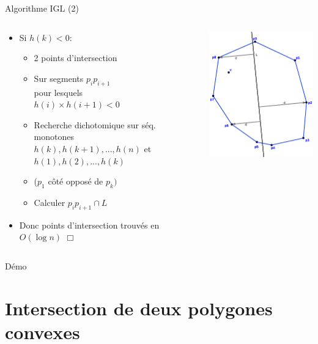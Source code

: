 \documentclass{beamer}
\begin{document}
\begin{frame}{Algorithme IGL (2)}
	\begin{columns}[c]
	\begin{column}[T]{.5\textwidth}
		\begin{itemize}
		\item Si $h(k) < 0$:
			\begin{itemize}
			\item 2 points d'intersection
			\item Sur segments $p_{i}p_{i+1}$\\
				pour lesquels\\
				$h(i) \times h(i+1) < 0$
			\item Recherche dichotomique sur séq. monotones\\
				$h(k),h(k+1),...,h(n)$ et\\
				$h(1),h(2),...,h(k)$
			\item ($p_{1}$ côté opposé de $p_{k})$
			\item Calculer $p_{i}p_{i+1} \cap L$
			\end{itemize}
		\item Donc points d'intersection trouvés en $O(\log n)$ $\Box$
		\end{itemize}
	\end{column}
	\begin{column}[T]{.5\textwidth}
		\includegraphics[width=5cm]{h.eps}
	\end{column}
	\end{columns}
\end{frame}

\begin{frame}
	\Large{Démo}
\end{frame}


\section{Intersection de deux polygones convexes}
\end{document}
